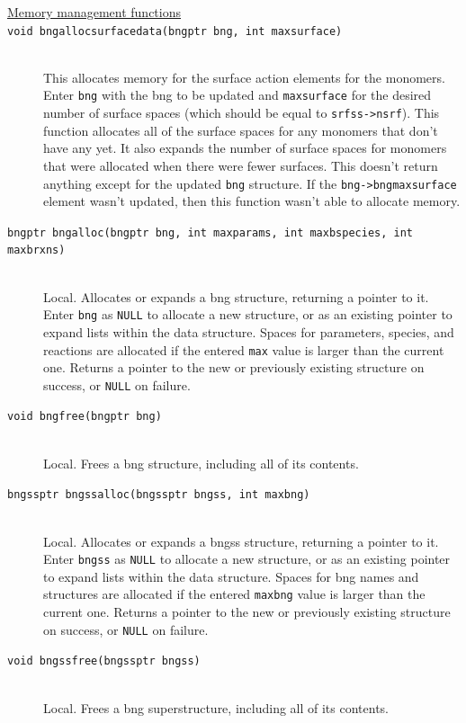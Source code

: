 \documentclass {scrbook}
\newcommand {\ttt} {\texttt}
\begin{document}
\begin{description}

\item[\underline{Memory management functions}]

\item[\ttt{void bngallocsurfacedata(bngptr bng, int maxsurface)}]
\hfill \\
This allocates memory for the surface action elements for the monomers. Enter \ttt{bng} with the bng to be updated and \ttt{maxsurface} for the desired number of surface spaces (which should be equal to \ttt{srfss->nsrf}). This function allocates all of the surface spaces for any monomers that don't have any yet. It also expands the number of surface spaces for monomers that were allocated when there were fewer surfaces. This doesn't return anything except for the updated \ttt{bng} structure. If the \ttt{bng->bngmaxsurface} element wasn't updated, then this function wasn't able to allocate memory.

\item[\ttt{bngptr bngalloc(bngptr bng, int maxparams, int maxbspecies, int maxbrxns)}]
\hfill \\
Local. Allocates or expands a bng structure, returning a pointer to it. Enter \ttt{bng} as \ttt{NULL} to allocate a new structure, or as an existing pointer to expand lists within the data structure. Spaces for parameters, species, and reactions are allocated if the entered \ttt{max} value is larger than the current one. Returns a pointer to the new or previously existing structure on success, or \ttt{NULL} on failure.

\item[\ttt{void bngfree(bngptr bng)}]
\hfill \\
Local. Frees a bng structure, including all of its contents.

\item[\ttt{bngssptr bngssalloc(bngssptr bngss, int maxbng)}]
\hfill \\
Local. Allocates or expands a bngss structure, returning a pointer to it. Enter \ttt{bngss} as \ttt{NULL} to allocate a new structure, or as an existing pointer to expand lists within the data structure. Spaces for bng names and structures are allocated if the entered \ttt{maxbng} value is larger than the current one. Returns a pointer to the new or previously existing structure on success, or \ttt{NULL} on failure.

\item[\ttt{void bngssfree(bngssptr bngss)}]
\hfill \\
Local. Frees a bng superstructure, including all of its contents.


\end{description}
\end{document}
